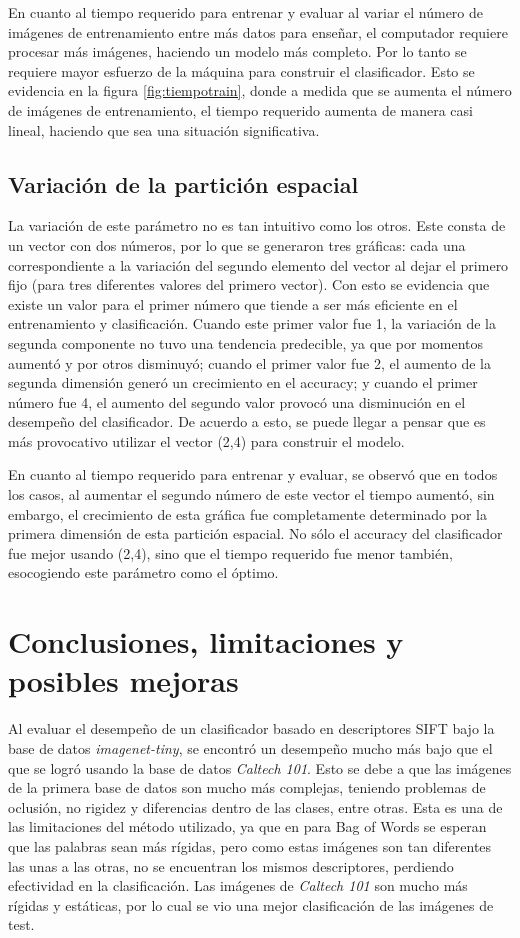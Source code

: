\documentclass[10pt,twocolumn,letterpaper]{article}
\begin{document}
En cuanto al tiempo requerido para entrenar y evaluar al variar el número de imágenes de entrenamiento entre más datos para enseñar, el computador requiere procesar más imágenes, haciendo un modelo más completo. Por lo tanto se requiere mayor esfuerzo de la máquina para construir el clasificador. Esto se evidencia en la figura \ref{fig:tiempotrain}, donde a medida que se aumenta el número de imágenes de entrenamiento, el tiempo requerido aumenta de manera casi lineal, haciendo que sea una situación significativa.

\subsection{Variación de la partición espacial}
La variación de este parámetro no es tan intuitivo como los otros. Este consta de un vector con dos números, por lo que se generaron tres gráficas: cada una correspondiente a la variación del segundo elemento del vector al dejar el primero fijo (para tres diferentes valores del primero vector). Con esto se evidencia que existe un valor para el primer número que tiende a ser más eficiente en el entrenamiento y clasificación. Cuando este primer valor fue 1, la variación de la segunda componente no tuvo una tendencia predecible, ya que por momentos aumentó y por otros disminuyó; cuando el primer valor fue 2, el aumento de la segunda dimensión generó un crecimiento en el accuracy; y cuando el primer número fue 4, el aumento del segundo valor provocó una disminución en el desempeño del clasificador. De acuerdo a esto, se puede llegar a pensar que es más provocativo utilizar el vector (2,4) para construir el modelo. 

En cuanto al tiempo requerido para entrenar y evaluar, se observó que en todos los casos, al aumentar el segundo número de este vector el tiempo aumentó, sin embargo, el crecimiento de esta gráfica fue completamente determinado por la primera dimensión de esta partición espacial. No sólo el accuracy del clasificador fue mejor usando (2,4), sino que el tiempo requerido fue menor también, esocogiendo este parámetro como el óptimo.
\section{Conclusiones, limitaciones y posibles mejoras}
Al evaluar el desempeño de un clasificador basado en descriptores SIFT bajo la base de datos \textit{imagenet-tiny}, se encontró un desempeño mucho más bajo que el que se logró usando la base de datos \textit{Caltech 101}. Esto se debe a que las imágenes de la primera base de datos son mucho más complejas, teniendo problemas de oclusión, no rigidez y diferencias dentro de las clases, entre otras. Esta es una de las limitaciones del método utilizado, ya que en para Bag of Words se esperan que las palabras sean más rígidas, pero como estas imágenes son tan diferentes las unas a las otras, no se encuentran los mismos descriptores, perdiendo efectividad en la clasificación. Las imágenes de \textit{Caltech 101} son mucho más rígidas y estáticas, por lo cual se vio una mejor clasificación de las imágenes de test. 
\end{document}
